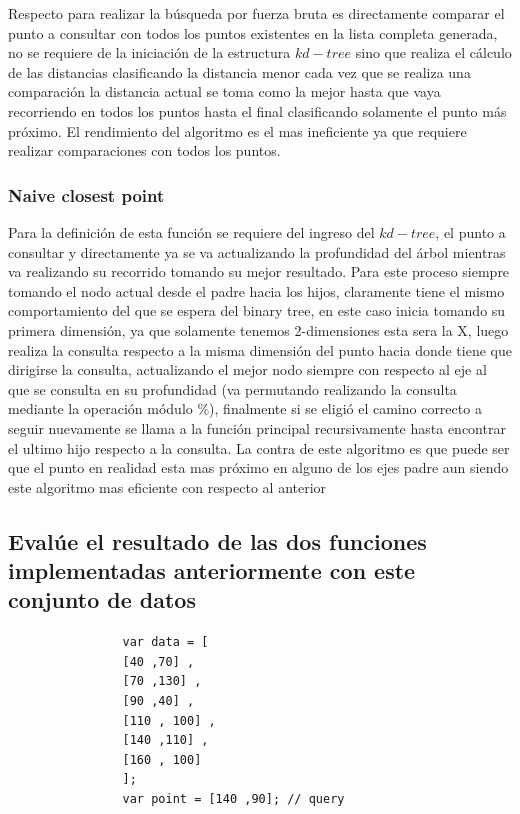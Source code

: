 \documentclass{article}
\begin{document}
    	        Respecto para realizar la búsqueda por fuerza bruta es directamente comparar el punto a consultar con todos los puntos existentes en la lista completa generada, no se requiere de la iniciación de la estructura $kd-tree$ sino que realiza el cálculo de las distancias clasificando la distancia menor cada vez que se realiza una comparación la distancia actual se toma como la mejor hasta que vaya recorriendo en todos los puntos hasta el final clasificando solamente el punto más próximo. El rendimiento del algoritmo es el mas ineficiente ya que requiere realizar comparaciones con todos los puntos.
    	        
    	        
    	        
    	    \subsubsection{Naive closest point} 
    	    
    	        Para la definición de esta función se requiere del ingreso del $kd-tree$, el punto a consultar y directamente ya se va actualizando la profundidad del árbol mientras va realizando su recorrido tomando su mejor resultado. Para este proceso siempre tomando el nodo actual desde el padre hacia los hijos, claramente tiene el mismo comportamiento del que se espera del binary tree, en este caso inicia tomando su primera dimensión, ya que solamente tenemos 2-dimensiones esta sera la X, luego realiza la consulta respecto a la misma dimensión del punto hacia donde tiene que dirigirse la consulta, actualizando el mejor nodo siempre con respecto al eje al que se consulta en su profundidad (va permutando realizando la consulta mediante la operación módulo $\%$), finalmente si se eligió el camino correcto a seguir nuevamente se llama a la función principal recursivamente hasta encontrar el ultimo hijo respecto a la consulta. La contra de este algoritmo es que puede ser que el punto en realidad esta mas próximo en alguno de los ejes padre aun siendo este algoritmo mas eficiente con respecto al anterior 
    	        
        	
		
		\subsection{Evalúe el resultado de las dos funciones implementadas anteriormente con este conjunto de datos} 
		    \begin{verbatim}
		        var data = [
                [40 ,70] ,
                [70 ,130] ,
                [90 ,40] ,
                [110 , 100] ,
                [140 ,110] ,
                [160 , 100]
                ];
                var point = [140 ,90]; // query
		    \end{verbatim}  
		    
\end{document}

